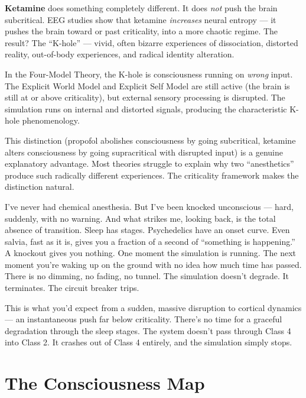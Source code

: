 \documentclass[11pt, twoside, openright]{book}
\begin{document}
\textbf{Ketamine} does something completely different. It does \textit{not} push the brain subcritical. EEG studies show that ketamine \textit{increases} neural entropy --- it pushes the brain toward or past criticality, into a more chaotic regime. The result? The ``K-hole'' --- vivid, often bizarre experiences of dissociation, distorted reality, out-of-body experiences, and radical identity alteration.

In the Four-Model Theory, the K-hole is consciousness running on \textit{wrong} input. The Explicit World Model and Explicit Self Model are still active (the brain is still at or above criticality), but external sensory processing is disrupted. The simulation runs on internal and distorted signals, producing the characteristic K-hole phenomenology.

This distinction (propofol abolishes consciousness by going subcritical, ketamine alters consciousness by going supracritical with disrupted input) is a genuine explanatory advantage. Most theories struggle to explain why two ``anesthetics'' produce such radically different experiences. The criticality framework makes the distinction natural.

I've never had chemical anesthesia. But I've been knocked unconscious --- hard, suddenly, with no warning. And what strikes me, looking back, is the total absence of transition. Sleep has stages. Psychedelics have an onset curve. Even salvia, fast as it is, gives you a fraction of a second of ``something is happening.'' A knockout gives you nothing. One moment the simulation is running. The next moment you're waking up on the ground with no idea how much time has passed. There is no dimming, no fading, no tunnel. The simulation doesn't degrade. It terminates. The circuit breaker trips.

This is what you'd expect from a sudden, massive disruption to cortical dynamics --- an instantaneous push far below criticality. There's no time for a graceful degradation through the sleep stages. The system doesn't pass through Class 4 into Class 2. It crashes out of Class 4 entirely, and the simulation simply stops.

\section*{The Consciousness Map}
\end{document}
